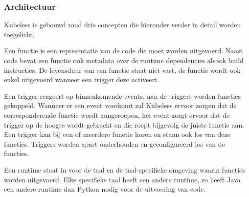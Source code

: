 \subsubsection{Architectuur}
Kubeless is gebouwd rond drie concepten die hieronder verder in detail worden toegelicht.
\begin{description}[style=unboxed, labelwidth=\linewidth, listparindent =0pt]
    \item[Functies]
    Een functie is een representatie van de code die moet worden uitgevoerd. Naast code bevat een functie ook metadata over de runtime dependencies alsook build instructies. De levensduur van een functie staat niet vast, de functie wordt ook enkel uitgevoerd wanneer een trigger deze activeert. \autocite{KnightXun2018}
    \newline
    
    \item[Triggers]
    Een trigger reageert op binnenkomende  events, aan de triggers worden functies gekoppeld. Wanneer er een event voorkomt zal Kubeless ervoor zorgen dat de corresponderende functie wordt aangeroepen, het event zorgt ervoor dat de trigger op de hoogte wordt gebracht en die roept bijgevolg de juiste functie aan. Een trigger kan bij een of meerdere functie horen en staan ook los van deze functies. Triggers worden apart onderhouden en geconfigureerd los van de functies. \autocite{KnightXun2018}
    \newline
    
    \item[Runtime]
    Een runtime staat in voor de taal en de taal-specifieke omgeving waarin functies worden uitgevoerd. Elke specifieke taal heeft een andere runtime, zo heeft Java een andere runtime dan Python nodig voor de uitvoering van code. \autocite{KnightXun2018}
    \newline
\end{description}


